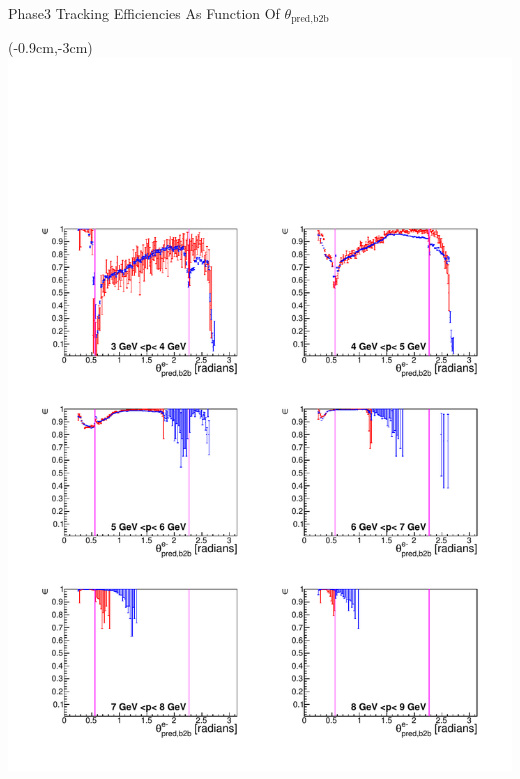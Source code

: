 \documentclass[8pt]{beamer}
\begin{document}
\begin{frame}{Phase3 Tracking Efficiencies As Function Of $\theta_{\textrm{pred,b2b}}$}
	
	
	\begin{textblock*}{6.5cm}(-0.9cm,-3cm)
		\includegraphics[width=\textwidth]{VPlots/P3/xPMThetaemP3}
	\end{textblock*}
	

\end{frame}
\end{document}
